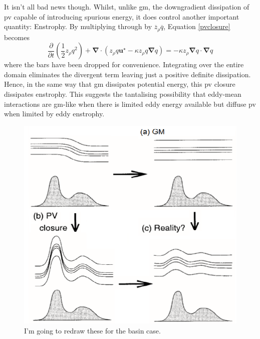 \documentclass[10pt,a4paper]{article}
\newcommand*\mean[1]{\overline{#1}}
\begin{document}
                It isn't all bad news though. Whilst, unlike \gls{gm}, the downgradient
                dissipation of \gls{pv} capable of introducing spurious energy, it does
                control another important quantity: Enstrophy. By multiplying through 
                by $\mean{z}_{\rho} \mean{q}$, Equation \ref{pvclosure} becomes 
                \begin{equation}
                \frac{\partial  }{\partial t}\left(\frac{1}{2}z_{\rho}q^{2}\right) + \boldsymbol{\nabla}\cdot\left(z_{\rho}q\boldsymbol{u}^\star-\kappa z_{\rho}q\boldsymbol{\nabla} q
                \right)=-\kappa z_\rho \boldsymbol{\nabla}q\cdot\boldsymbol{\nabla}q
                \end{equation}
                where the bars have been dropped for convenience.
                Integrating over the entire domain eliminates the divergent term
                leaving just a positive definite dissipation.
                Hence, in the same way that \gls{gm} dissipates potential energy, this
                \gls{pv} closure dissipates enstrophy. This suggests the tantalising
                possibility that eddy-mean interactions are \gls{gm}-like when
                there is limited eddy energy available but diffuse \gls{pv} when
                limited by eddy enstrophy.
                
                \begin{figure}
                	\centering
                	\includegraphics[width=0.6\linewidth]{am00}
                	\caption[Cold-doming]{I'm going to redraw these for the basin case.}
                	\label{fig:Colddoming}
                \end{figure}
                
\end{document}
